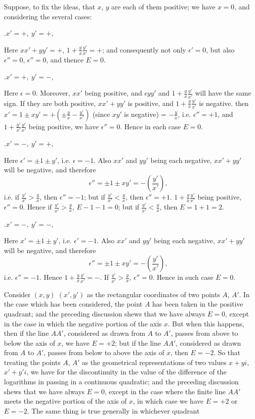 \documentclass[12pt,a4paper]{article}
\theoremstyle{definition}
\begin{document}
Suppose, to fix the ideas, that $x$, $y$ are each of them positive; we have $x = 0$,
and considering the several cases:

\medskip

.\quad $x' = +,\ y' = +,$

Here $xx' + yy' = +$, $1 + \frac{y}{x}\frac{y'}{x'} = +$; and consequently not only $\epsilon' = 0$, but also $\epsilon'' = 0$,
$\epsilon'' = 0$, and thence $E = 0$.

.\quad $x' = +,\ y' = -,$

Here $\epsilon = 0$. Moreover, $xx'$ being positive, and $\epsilon yy'$ and $1 + \frac{y}{x}\frac{y'}{x'}$ will have the
same sign. If they are both positive, $xx' + yy'$ is positive, and $1 + \frac{y}{x}\frac{y'}{x'}$ is negative.
then $x' = 1 \pm xy' = +(\pm \frac{y}{x} - \frac{y'}{x'})$ (since $xy'$ is negative) = $-\frac{y}{x}$, i.e. $\epsilon'' = +1$, and
$1 + \frac{y'}{x'}\frac{y'}{x'}$ being positive, we have $\epsilon'' = 0$. Hence in each case $E = 0$.

.\quad $x' = -,\ y' = +,$

Here $\epsilon' = \pm 1 \pm y'$, i.e. $\epsilon = -1$. Also $xx'$ and $yy'$ being each negative, $xx' + yy'$
will be negative, and therefore
\[
\epsilon'' = \pm 1 \pm xy' = -\left(\frac{y'}{x'}\right),
\]
i.e. if $\frac{y'}{x'} > \frac{y}{x}$, then $\epsilon'' = -1$; but if $\frac{y'}{x'} < \frac{y}{x}$, then $\epsilon'' = +1$. $1 + \frac{y}{x}\frac{y'}{x'}$ being positive,
$\epsilon'' = 0$. Hence if $\frac{y'}{x'} > \frac{y}{x}$, $E - 1 - 1 = 0$; but if $\frac{y'}{x'} < \frac{y}{x}$, then $E = 1 + 1 = 2$.

.\quad $x' = -,\ y' = -,$

Here $x' = \pm 1 \pm y'$, i.e. $\epsilon' = -1$. Also $xx'$ and $yy'$ being each negative, $xx' + yy'$
will be negative, and therefore
\[
\epsilon'' = \pm 1 \pm xy' = -\left(\frac{y'}{x'}\right),
\]
i.e. $\epsilon'' = -1$. Hence $1 + \frac{y}{x}\frac{y'}{x'} = -$. If $\frac{y'}{x'} > \frac{y}{x}$, $\epsilon'' = 0$. Hence in such case $E = 0$.

\smallskip

Consider $(x, y)$ $(x', y')$ as the rectangular coordinates of two points $A$, $A'$. In
the case which has been considered, the point $A$ has been taken in the positive
quadrant; and the preceding discussion shews that we have always $E = 0$, except in
the case in which the negative portion of the axis $x$. But when this happens, then if
the line $AA'$, considered as drawn from $A$ to $A'$, passes from above to below the
axis of $x$, we have $E = +2$; but if the line $AA'$, considered as drawn from $A$ to $A'$,
passes from below to above the axis of $x$, then $E = -2$. So that treating the points
$A$, $A'$ as the geometrical representations of two values $x + yi$, $x' + y'i$, we have for the
discontinuity in the value of the difference of the logarithms in passing in a continuous
quadratic; and the preceding discussion shews that we have always $E = 0$, except in
the case where the finite line $AA'$ meets the negative portion of the axis of $x$, in
which case we have $E = +2$ or $E = -2$. The same thing is true generally in whichever quadrant
\end{document}
